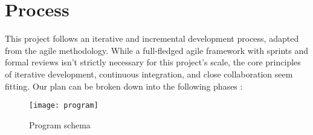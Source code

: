 \section{Process}
This project follows an iterative and incremental development process, adapted from the agile methodology.  While a full-fledged agile framework with sprints and formal reviews isn't strictly necessary for this project's scale, the core principles of iterative development, continuous integration, and close collaboration seem fitting.  Our plan can be broken down into the following phases :

\begin{figure}
    \centering
    \texttt{[image: program]}
    \caption{Program schema}
    \label{fig:program}
\end{figure}

